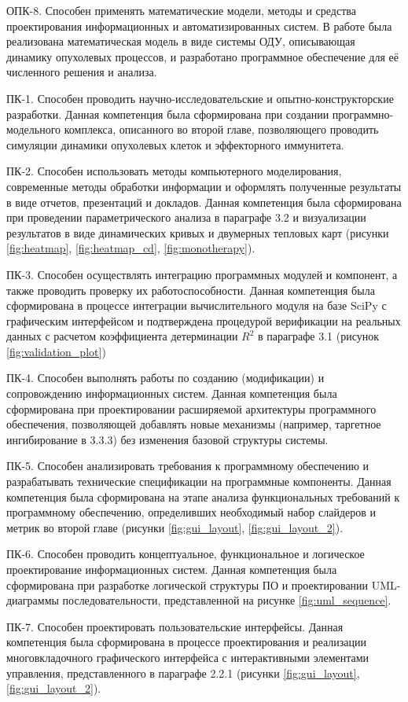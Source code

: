 ОПК-8. Способен применять математические модели, методы и средства
проектирования информационных и автоматизированных систем. В работе была
реализована математическая модель в виде системы ОДУ, описывающая динамику
опухолевых процессов, и разработано программное обеспечение для её численного
решения и анализа.

ПК-1. Способен проводить научно-исследовательские и опытно-конструкторские
разработки. Данная компетенция была сформирована при создании
программно-модельного комплекса, описанного во второй главе, позволяющего
проводить симуляции динамики опухолевых клеток и эффекторного иммунитета.

ПК-2. Способен использовать методы компьютерного моделирования, современные
методы обработки информации и оформлять полученные результаты в виде отчетов,
презентаций и докладов. Данная компетенция была сформирована при проведении
параметрического анализа в параграфе 3.2 и визуализации результатов в виде
динамических кривых и двумерных тепловых карт (рисунки \ref{fig:heatmap},
\ref{fig:heatmap_cd}, \ref{fig:monotherapy}).

ПК-3. Способен осуществлять интеграцию программных модулей и компонент, а также
проводить проверку их работоспособности. Данная компетенция была сформирована в
процессе интеграции вычислительного модуля на базе SciPy с графическим
интерфейсом и подтверждена процедурой верификации на реальных данных с расчетом
коэффициента детерминации $R^2$ в параграфе 3.1 (рисунок \ref{fig:validation_plot})

ПК-4. Способен выполнять работы по созданию (модификации) и сопровождению
информационных систем. Данная компетенция была сформирована при проектировании
расширяемой архитектуры программного обеспечения, позволяющей добавлять новые
механизмы (например, таргетное ингибирование в 3.3.3) без изменения базовой
структуры системы.

ПК-5. Способен анализировать требования к программному обеспечению и
разрабатывать технические спецификации на программные компоненты. Данная
компетенция была сформирована на этапе анализа функциональных требований к
программному обеспечению, определивших необходимый набор слайдеров и
метрик во второй главе (рисунки \ref{fig:gui_layout}, \ref{fig:gui_layout_2}).

ПК-6. Способен проводить концептуальное, функциональное и логическое
проектирование информационных систем. Данная компетенция была сформирована при
разработке логической структуры ПО и проектировании UML-диаграммы
последовательности, представленной на рисунке \ref{fig:uml_sequence}.

ПК-7. Способен проектировать пользовательские интерфейсы. Данная компетенция
была сформирована в процессе проектирования и реализации многовкладочного
графического интерфейса с интерактивными элементами управления, представленного
в параграфе 2.2.1 (рисунки \ref{fig:gui_layout}, \ref{fig:gui_layout_2}).